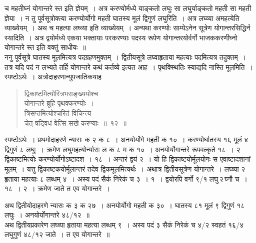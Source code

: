 \documentclass[11pt, openany]{book}
\begin{document}
\noindent च महतीघ्नं योगान्तरे स्त इति ज्ञेयम्~। अत्र करण्योर्मध्ये याङ्कतो लघुः सा लघुर्याङ्कतो महती सा महती ज्ञेया~। न तु पूर्वसूत्रोक्त्या करण्योर्योगो महती घातस्य मूलं द्विगुणं लघुरिति~। अत्र लघ्व्या अमहत्येति 
व्याख्येयम्~। अथ च महत्या लघ्व्या इति व्याख्येयम्~। अन्यथा 
करण्योः साम्येऽनेन सूत्रेण योगान्तरसिद्धिर्न स्यादिति~। अत्र
द्वयोर्मध्ये एकया भक्तायाः परकरण्याः पदस्य रूपेण योगान्तरयोर्वर्गो भाजककरणीघ्नो 
योगान्तरे स्त इति वक्तुं साधीयः~॥ \\

\vspace{-3mm}
 ननु पूर्वसूत्रे घातस्य मूलमित्यत्र पदग्रहणमुक्तम्~। द्वितीयसूत्रे 
लघ्वाहृताया महत्याः पदमित्यत्र तदुक्तम्~। तत्र यदि पदं न लभ्यते 
तर्हि योगान्तरे कथं कर्तव्ये इत्यत आह~। पृथक्स्थितिः स्याद्यदि 
नास्ति मूलमिति~। स्पष्टोऽर्थः~। अत्रोदाहरणान्युपजातिकयाह\textendash  
\begin{quote}
\ex
 द्विकाष्टमित्योस्त्रिभसङ्ख्ययोश्च \\

 \vspace{-7mm}
\hspace{1cm} योगान्तरे ब्रूहि पृथक्करण्योः~। \\

 \vspace{-7mm}
 त्रिसप्तमित्योश्चरितं विचिन्त्य \\

 \vspace{-7mm}
\hspace{1cm}चेत् षड्विधं वेत्सि सखे करण्याः~॥~१२~॥
\end{quote}

 स्पष्टोऽर्थः~। प्रथमोदाहरणे न्यासः क २ क ८~। अनयोर्योगे महती क १०~। 
करण्योर्घातस्य १६ मूलं ४ द्विगुणं ८ लघुः~। क्रमेण लघुमहत्योर्न्यासः ल क
८ म क १०~। अनयोर्योगान्तरे रूपवत्कृते १८~। २ द्विकाष्टमित्योः
करण्योर्योगोऽष्टादश~। १८~। अन्तरं द्वयं २~। यो हि द्विकाष्टयोर्मूलयोगः स एवाष्टादशानां मूलम्~। यत्तु द्विकाष्टकयोर्मूलान्तरं तदेव द्विकमूलमित्यर्थः~। अथात्र
द्वितीयसूत्रेण योगान्तरे~। लघ्व्या २ हृताया महत्याः ८ लब्धम् ४~। अस्य पदं सैकं 
निरेकं च ३~। १~। द्वयोरपि वर्गो ९/१ लघु\textendash \,२\textendash \,घ्नौ च~। १८~। २~। क्रमेण जाते त एव योगान्तरे~।
\newpage

 अथ द्वितीयोदाहरणे न्यासः क ३ क २७~। अनयोर्योगो महती 
क ३०~। घातस्य ८१ मूलं ९ द्विगुणं १८ लघुः~। अनयोर्योगान्तरे ४८/१२~॥ \\

\vspace{-3mm}
 अथ द्वितीयप्रकारेण लघ्व्या हृताया महत्या लब्धम् ९~। अस्य पदं ३ 
सैकं निरेकं च ४/२ स्वहतं १६/४ लघुगुणं ४८/१२ जाते~। त एव 
योगान्तरे~॥ \\
\end{document}
